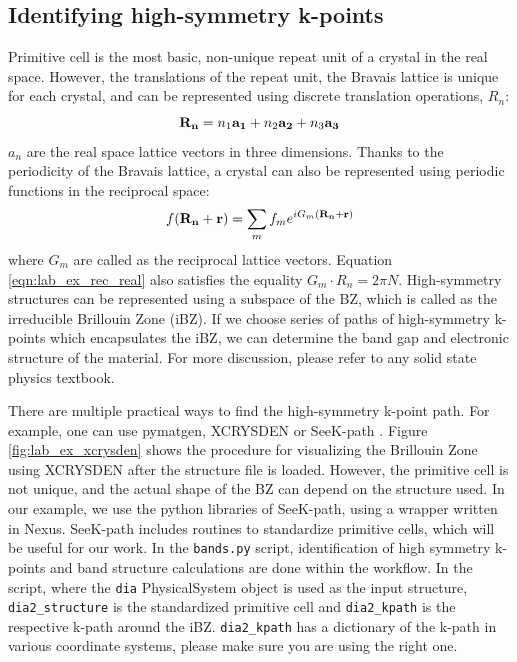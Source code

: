 \subsection{Identifying high-symmetry k-points}\label{sec:lab_ex_highk}
Primitive cell is the most basic, non-unique repeat unit of a crystal in the real space. 
However, the translations of the repeat unit, the Bravais lattice is unique for each crystal, and can be represented using discrete translation operations, $R_n$:
\begin{equation}
{\bf R_n} = n_1{\bf a_1} + n_2{\bf a_2} + n_3{\bf a_3}
\end{equation}
$a_n$ are the real space lattice vectors in three dimensions. Thanks to the periodicity of the Bravais lattice, a crystal can also be represented using periodic functions in the reciprocal space:
\begin{equation}
f({\bf R_n + r})= \sum_{m}f_me^{iG_m({\bf R_n+r})}\label{eqn:lab_ex_rec_real}
\end{equation}
where $G_m$ are called as the reciprocal lattice vectors. Equation \ref{eqn:lab_ex_rec_real} also satisfies the equality $G_m\cdot{R_n}=2{\pi}N$. High-symmetry structures can be represented using a subspace of the BZ, which is called as the irreducible Brillouin Zone (iBZ). If we choose series of  paths of high-symmetry k-points which encapsulates the iBZ, we can determine the band gap and electronic structure of the material. For more discussion, please refer to any solid state physics textbook. 

There are multiple practical ways to find the high-symmetry k-point path. 
For example, one can use pymatgen, \cite{Ong2013} XCRYSDEN \cite{Kokalj1999} or SeeK-path \cite{Hinuma2017}. 
Figure \ref{fig:lab_ex_xcrysden} shows the procedure for visualizing the Brillouin Zone using XCRYSDEN after the structure file is loaded. 
However, the primitive cell is not unique, and the actual shape of the BZ can depend on the structure used. 
In our example, we use the python libraries of SeeK-path, using a wrapper written in Nexus. 
SeeK-path includes routines to standardize primitive cells, which will be useful for our work. 
In the \texttt{bands.py} script, identification of high symmetry k-points and band structure calculations are done within the workflow. 
In the script, where the \texttt{dia} PhysicalSystem object is used as the input structure, \texttt{dia2\_structure} is the standardized primitive cell and \texttt{dia2\_kpath} is the respective k-path around the iBZ. 
\texttt{dia2\_kpath} has a dictionary of the k-path in various coordinate systems, please make sure you are using the right one. 

